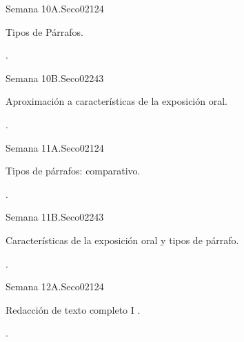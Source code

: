\begin{syllabus}
\begin{unit}{Semana 10A.}{}{Seco02}{12}{4}
   \begin{topics}
      \item Tipos de Párrafos.
   \end{topics}
   \begin{learningoutcomes}
      \item .
   \end{learningoutcomes}
\end{unit}

\begin{unit}{Semana 10B.}{}{Seco02}{24}{3}
   \begin{topics}
      \item Aproximación a características de la exposición oral.
   \end{topics}

   \begin{learningoutcomes}
      \item .
      \end{learningoutcomes}
\end{unit}

\begin{unit}{Semana 11A.}{}{Seco02}{12}{4}
   \begin{topics}
      \item Tipos de párrafos: comparativo.
   \end{topics}
   \begin{learningoutcomes}
      \item .
   \end{learningoutcomes}
\end{unit}

\begin{unit}{Semana 11B.}{}{Seco02}{24}{3}
   \begin{topics}
      \item Características de la exposición oral y tipos de párrafo.
   \end{topics}

   \begin{learningoutcomes}
      \item .
      \end{learningoutcomes}
\end{unit}

\begin{unit}{Semana 12A.}{}{Seco02}{12}{4}
   \begin{topics}
      \item Redacción de texto completo I .
   \end{topics}
   \begin{learningoutcomes}
      \item .
   \end{learningoutcomes}
\end{unit}


\end{syllabus}
